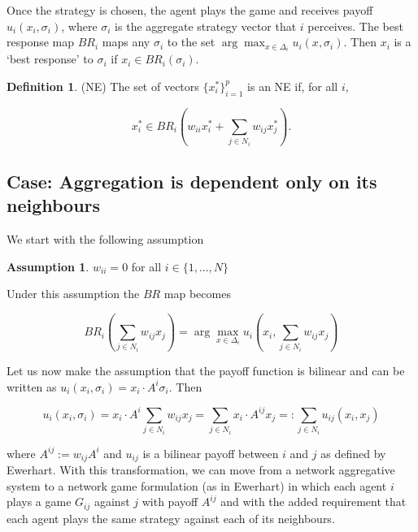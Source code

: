 \documentclass{article}
\theoremstyle{definition}
\newtheorem*{definition}{Definition}
\newtheorem{assumption}{Assumption}
\begin{document}
	Once the strategy is chosen, the agent plays the game and receives payoff $u_i (x_i, \sigma_i)$, where $\sigma_i$ is the aggregate strategy vector that $i$ perceives. The best response map $BR_i$ maps any $\sigma_i$ to the set $\arg\max_{x \in \Delta_i} u_i (x, \sigma_i)$. Then $x_i$ is a `best response' to $\sigma_i$ if $x_i \in BR_i(\sigma_i)$.
	
	\begin{definition}(NE)
		The set of vectors $\{ x_i^*\}_{i = 1}^p$ is an NE if, for all $i$,
		
		\begin{equation*}
		x_i^* \in BR_i( w_{ii} x_i^* + \sum_{j \in N_i} w_{ij} x_j^*).
		\end{equation*}
		
	\end{definition}
	
	\subsection*{Case: Aggregation is dependent only on its neighbours}
	
	We start with the following assumption
	
	\begin{assumption}
	$w_{ii} = 0$ for all $i \in \{ 1, ..., N \}$
	\end{assumption}
	
	Under this assumption the $BR$ map becomes
	
	\begin{equation}
		BR_i(\sum_{j \in N_i} w_{ij} x_j) = \arg\max_{x \in \Delta_i} u_i(x_i,\sum_{j \in N_i} w_{ij} x_j)
	\end{equation}
	
	Let us now make the assumption that the payoff function is bilinear and can be written as $u_i(x_i, \sigma_i) = x_i \cdot A^i \sigma_i$. Then 
	
	\begin{equation*}
		u_i(x_i, \sigma_i) = x_i \cdot A^i \sum_{j \in N_i} w_{ij} x_j = \sum_{j \in N_i} x_i \cdot A^{ij} x_j =: \sum_{j \in N_i} u_{ij}(x_i, x_j) 
	\end{equation*}
	
	where $A^{ij} := w_{ij} A^i$ and $u_{ij}$ is a bilinear payoff between $i$ and $j$ as defined by Ewerhart. With this transformation, we can move from a network aggregative system to a network game formulation (as in Ewerhart) in which each agent $i$ plays a game $G_{ij}$ against $j$ with payoff $A^{ij}$ and with the added requirement that each agent plays the same strategy against each of its neighbours.
	
\end{document}
